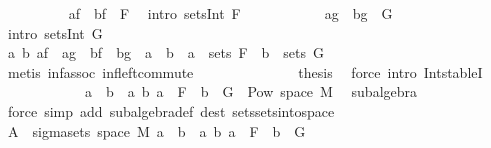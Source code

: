 \begin{isabellebody}
\ \ \ \ \ \ \ \ \isamarkupfalse%
\ {\isachardoublequoteopen}af\ {\isasyminter}\ bf\ {\isasymin}\ F{\isachardoublequoteclose}\ \isamarkupfalse%
\ {\isacharparenleft}{\kern0pt}intro\ sets{\isachardot}{\kern0pt}Int\ F{\isacharparenright}{\kern0pt}\isanewline
\ \ \ \ \ \ \ \ \isamarkupfalse%
\ \isamarkupfalse%
\ {\isachardoublequoteopen}ag\ {\isasyminter}\ bg\ {\isasymin}\ G{\isachardoublequoteclose}\ \isamarkupfalse%
\ {\isacharparenleft}{\kern0pt}intro\ sets{\isachardot}{\kern0pt}Int\ G{\isacharparenright}{\kern0pt}\isanewline
\ \ \ \ \ \ \ \ \isamarkupfalse%
\ \isamarkupfalse%
\ {\isachardoublequoteopen}{\isasymexists}a\ b{\isachardot}{\kern0pt}\ af\ {\isasyminter}\ ag\ {\isasyminter}\ {\isacharparenleft}{\kern0pt}bf\ {\isasyminter}\ bg{\isacharparenright}{\kern0pt}\ {\isacharequal}{\kern0pt}\ a\ {\isasyminter}\ b\ {\isasymand}\ a\ {\isasymin}\ sets\ F\ {\isasymand}\ b\ {\isasymin}\ sets\ G{\isachardoublequoteclose}\ \isamarkupfalse%
\ {\isacharparenleft}{\kern0pt}metis\ inf{\isacharunderscore}{\kern0pt}assoc\ inf{\isacharunderscore}{\kern0pt}left{\isacharunderscore}{\kern0pt}commute{\isacharparenright}{\kern0pt}\isanewline
\ \ \ \ \ \ \isacommand{{\isacharbraceright}{\kern0pt}}\isamarkupfalse%
\isanewline
\ \ \ \ \ \ \isamarkupfalse%
\ {\isacharquery}{\kern0pt}thesis\ \isamarkupfalse%
\ {\isacharparenleft}{\kern0pt}force\ intro{\isacharbang}{\kern0pt}{\isacharcolon}{\kern0pt}\ Int{\isacharunderscore}{\kern0pt}stableI{\isacharparenright}{\kern0pt}\isanewline
\ \ \ \ \isamarkupfalse%
\isanewline
\ \ \ \ \isamarkupfalse%
\ \isamarkupfalse%
\ {\isachardoublequoteopen}{\isacharbraceleft}{\kern0pt}a\ {\isasyminter}\ b\ {\isacharbar}{\kern0pt}\ a\ b{\isachardot}{\kern0pt}\ a\ {\isasymin}\ F\ {\isasymand}\ b\ {\isasymin}\ G{\isacharbraceright}{\kern0pt}\ {\isasymsubseteq}\ Pow\ {\isacharparenleft}{\kern0pt}space\ M{\isacharparenright}{\kern0pt}{\isachardoublequoteclose}\ \isamarkupfalse%
\ subalgebra\ \isamarkupfalse%
\ {\isacharparenleft}{\kern0pt}force\ simp\ add{\isacharcolon}{\kern0pt}\ subalgebra{\isacharunderscore}{\kern0pt}def\ dest{\isacharcolon}{\kern0pt}\ sets{\isachardot}{\kern0pt}sets{\isacharunderscore}{\kern0pt}into{\isacharunderscore}{\kern0pt}space{\isacharparenright}{\kern0pt}\isanewline
\ \ \ \ \isamarkupfalse%
\ \isamarkupfalse%
\ {\isachardoublequoteopen}A\ {\isasymin}\ sigma{\isacharunderscore}{\kern0pt}sets\ {\isacharparenleft}{\kern0pt}space\ M{\isacharparenright}{\kern0pt}\ {\isacharbraceleft}{\kern0pt}a\ {\isasyminter}\ b\ {\isacharbar}{\kern0pt}\ a\ b{\isachardot}{\kern0pt}\ a\ {\isasymin}\ F\ {\isasymand}\ b\ {\isasymin}\ G{\isacharbraceright}{\kern0pt}{\isachardoublequoteclose}\ \isamarkupfalse%

\end{isabellebody}
